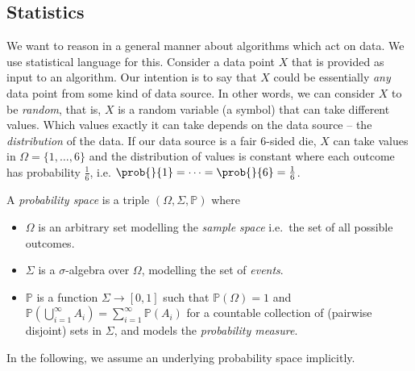 \documentclass[
    a4paper, %
	fontsize=10pt, %
	twoside=false, %
]{kaobook}
\begin{document}
\begin{titlepage}


\section{Statistics}

We want to reason in a general manner about algorithms which act on data. We use statistical language for this. Consider a data point $X$ that is provided as input to an algorithm. Our intention is to say that $X$ could be essentially \textit{any} data point from some kind of data source. In other words, we can consider $X$ to be \textit{random}, that is, $X$ is a random variable (a symbol) that can take different values. 
Which values exactly it can take depends on the data source -- the \textit{distribution} of the data. If our data source is a fair $6$-sided die, $X$ can take values in $\Omega = \{ 1, \dots, 6 \}$ and the distribution of values is constant where each outcome has probability $\frac{1}{6}$, i.e. $\prob{}{1} = \dots  = \prob{}{6} = \frac{1}{6}$.
\begin{definition}
  A \textit{probability space} is a triple \((\Omega, \Sigma, \mathbb{P})\)
  where
  \begin{itemize}
  \item \(\Omega\) is an arbitrary set modelling the \textit{sample space}
    i.e.~the set of all possible outcomes.
  \item \(\Sigma\) is a \(\sigma\)-algebra
    over \(\Omega\), modelling the set of \textit{events}.
    \item \(\mathbb{P}\) is a function
    \(\Sigma \to [0,1]\) such that \(\mathbb{P}(\Omega)=1\) and
    \(\mathbb{P}\left( \bigcup_{i=1}^\infty A_{i} \right) = \sum_{i=1}^\infty
    \mathbb{P}(A_{i})\) for a countable collection of (pairwise disjoint) sets
    in \(\Sigma\), and models the \textit{probability measure}.
  \end{itemize}
\end{definition}
In the following, we assume an underlying probability space implicitly.
\end{titlepage}
\end{document}
